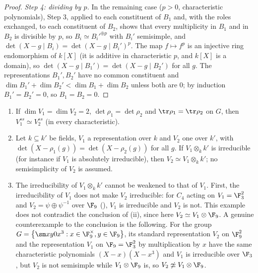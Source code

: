 \begin{proof}
\emph{Step 4: dividing by $p$.} In the remaining case ($p>0$, characteristic polynomials), Step 3, applied to each constituent of $B_1$ and,
with the roles exchanged, to each constituent of $B_2$, shows that every multiplicity in $B_1$ and in $B_2$ is divisible
by $p$, so $B_i\simeq B_i'^{\oplus p}$ with $B_i'$ semisimple, and $\det(X-g\mid B_i)=\det(X-g\mid B_i')^p$. The map $f\mapsto f^p$ is an injective ring
endomorphism of $k[X]$ (it is additive in characteristic $p$, and $k[X]$ is a domain), so $\det(X-g\mid B_1')=\det(X-g\mid B_2')$ for all $g$. The
representations $B_1',B_2'$ have no common constituent and $\dim B_1'+\dim B_2'<\dim B_1+\dim B_2$ unless both are $0$; by induction $B_1'=B_2'=0$,
so $B_1=B_2=0$.
\end{proof}

\begin{corollary}\label{cor:reps:bn-consequences}
\begin{enumerate}[label=(\roman*)]
\item If $\dim V_1=\dim V_2=2$, $\det\rho_1=\det\rho_2$ and $\tr\rho_1=\tr\rho_2$ on $G$, then $V_1^{ss}\simeq V_2^{ss}$ (in every characteristic).
\item Let $k\subseteq k'$ be fields, $V_1$ a representation over $k$ and $V_2$ one over $k'$, with $\det(X-\rho_1(g))=\det(X-\rho_2(g))$ for all $g$. If
$V_1\otimes_kk'$ is irreducible (for instance if $V_1$ is absolutely irreducible), then $V_2\simeq V_1\otimes_kk'$; no semisimplicity of $V_2$ is
assumed.
\item The irreducibility of $V_1\otimes_kk'$ cannot be weakened to that of $V_1$. First, the irreducibility of $V_1$ does not make $V_2$
irreducible: for $C_4$ acting on $V_1=\F_3^2$ and $V_2=\psi\oplus\psi^{-1}$ over $\F_9$ (), $V_1$ is irreducible and $V_2$ is not. This
example does not contradict the conclusion of (ii), since here $V_2\simeq V_1\otimes\F_9$. A genuine counterexample to the conclusion is the
following. For the group $G=\bigl\{\sm x y0{x^3}:x\in\F_9^\times,y\in\F_9\bigr\}$, its standard
representation $V_2$ on $\F_9^2$ and the representation $V_1$ on $\F_9=\F_3^2$ by multiplication by $x$ have the same characteristic
polynomials $(X-x)(X-x^3)$ and $V_1$ is irreducible over $\F_3$, but $V_2$ is not semisimple while $V_1\otimes\F_9$ is, so $V_2\not\simeq V_1\otimes\F_9$.
\end{enumerate}
\end{corollary}

